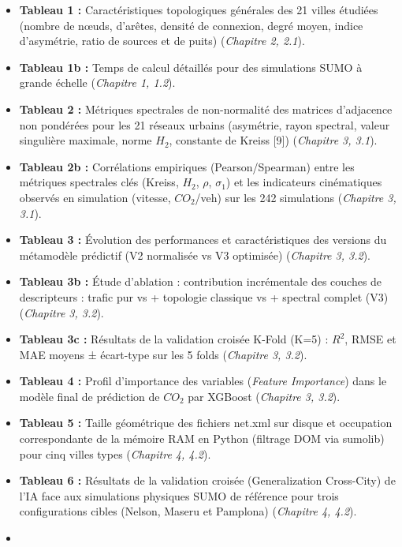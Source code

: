 \documentclass[10pt, a4paper]{article}
\providecommand{\tightlist}{}
\begin{document}
\begin{itemize}
\tightlist
\item
  \textbf{Tableau 1 :} Caractéristiques topologiques générales des 21
  villes étudiées (nombre de nœuds, d'arêtes, densité de connexion,
  degré moyen, indice d'asymétrie, ratio de sources et de puits)
  (\emph{Chapitre 2, 2.1}).
\item
  \textbf{Tableau 1b :} Temps de calcul détaillés pour des simulations
  SUMO à grande échelle (\emph{Chapitre 1, 1.2}).
\item
  \textbf{Tableau 2 :} Métriques spectrales de non-normalité des
  matrices d'adjacence non pondérées pour les 21 réseaux urbains
  (asymétrie, rayon spectral, valeur singulière maximale, norme \(H_2\),
  constante de Kreiss {[}9{]}) (\emph{Chapitre 3, 3.1}).
\item
  \textbf{Tableau 2b :} Corrélations empiriques (Pearson/Spearman) entre
  les métriques spectrales clés (Kreiss, \(H_2\), \(\rho\),
  \(\sigma_1\)) et les indicateurs cinématiques observés en simulation
  (vitesse, \(CO_2\)/veh) sur les 242 simulations (\emph{Chapitre 3,
  3.1}).
\item
  \textbf{Tableau 3 :} Évolution des performances et caractéristiques
  des versions du métamodèle prédictif (V2 normalisée vs V3 optimisée)
  (\emph{Chapitre 3, 3.2}).
\item
  \textbf{Tableau 3b :} Étude d'ablation : contribution incrémentale des
  couches de descripteurs : trafic pur vs + topologie classique vs +
  spectral complet (V3) (\emph{Chapitre 3, 3.2}).
\item
  \textbf{Tableau 3c :} Résultats de la validation croisée K-Fold (K=5)
  : \(R^2\), RMSE et MAE moyens ± écart-type sur les 5 folds
  (\emph{Chapitre 3, 3.2}).
\item
  \textbf{Tableau 4 :} Profil d'importance des variables (\emph{Feature
  Importance}) dans le modèle final de prédiction de \(CO_2\) par
  XGBoost (\emph{Chapitre 3, 3.2}).
\item
  \textbf{Tableau 5 :} Taille géométrique des fichiers net.xml sur
  disque et occupation correspondante de la mémoire RAM en Python
  (filtrage DOM via sumolib) pour cinq villes types (\emph{Chapitre 4,
  4.2}).
\item
  \textbf{Tableau 6 :} Résultats de la validation croisée
  (Generalization Cross-City) de l'IA face aux simulations physiques
  SUMO de référence pour trois configurations cibles (Nelson, Maseru et
  Pamplona) (\emph{Chapitre 4, 4.2}).
\item

\end{itemize}
\end{document}

